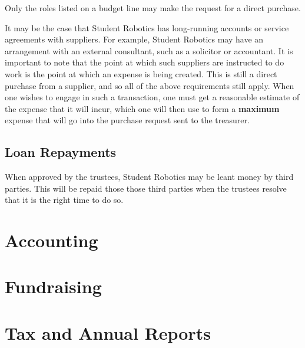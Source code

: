 Only the roles listed on a budget line may make the request for a direct purchase.

It may be the case that Student Robotics has long-running accounts or service agreements with suppliers.  For example, Student Robotics may have an arrangement with an external consultant, such as a solicitor or accountant.  It is important to note that the point at which such suppliers are instructed to do work is the point at which an expense is being created.  This is still a direct purchase from a supplier, and so all of the above requirements still apply.  When one wishes to engage in such a transaction, one must get a reasonable estimate of the expense that it will incur, which one will then use to form a \textbf{maximum} expense that will go into the purchase request sent to the treasurer.

\subsection{Loan Repayments}

When approved by the trustees, Student Robotics may be leant money by third parties.  This will be repaid those those third parties when the trustees resolve that it is the right time to do so.

\begin{draft}
\section{Accounting}

\section{Fundraising}

\section{Tax and Annual Reports}
\end{draft}
